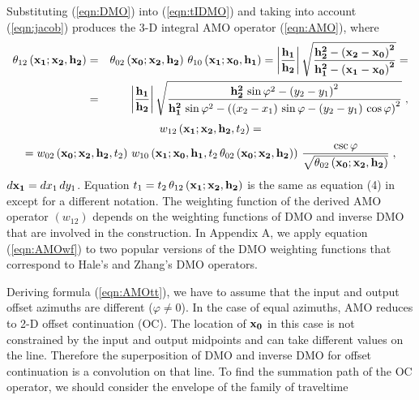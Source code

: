 \par
Substituting (\ref{eqn:DMO}) into (\ref{eqn:tIDMO}) and taking into account
(\ref{eqn:jacob}) produces the 3-D integral AMO operator (\ref{eqn:AMO}),
where
\begin{eqnarray}
\theta_{12}\left({\bf x_1;x_2, h_2}\right) & = &
\theta_{02}\left({\bf x_0;x_2, h_2}\right)\,
\theta_{10}\left({\bf x_1;x_0, h_1}\right)=
{\left|{\bf h_1 \over h_2}\right|}\,
\sqrt{{\bf {h_2^2-\left(x_2-x_0\right)^2} \over
{h_1^2-\left(x_1-x_0\right)^2}}}=
\nonumber \\
& = &
{\left|{\bf h_1 \over h_2}\right|}\,
\sqrt{{{\bf h_2^2}\,\sin{\varphi}^2-\left(y_2-y_1\right)^2} \over
{{\bf h_1^2}\,\sin{\varphi}^2-
\left(\left(x_2-x_1\right)\,\sin{\varphi}-
\left(y_2-y_1\right)\,\cos{\varphi}\right)^2}}\;,
\label{eqn:AMOtt}
\end{eqnarray}
\begin{eqnarray*}
w_{12}\left({\bf x_1;x_2, h_2},t_2\right) = 
\end{eqnarray*}
\begin{equation}
= w_{02}\left({\bf x_0;x_2, h_2},t_2\right)\,
w_{10}\left({\bf x_1;x_0, h_1},t_2\,
\theta_{02}\left({\bf x_0;x_2, h_2}\right)\right)\,
{\csc{\varphi}\over \sqrt{\theta_{02}\left({\bf x_0;x_2, h_2}\right)}}\;,
\label{eqn:AMOwf}
\end{equation}
$d{\bf x_1}=dx_1\,dy_1$. Equation 
$t_1=t_2\,\theta_{12}\left({\bf x_1;x_2, h_2}\right)$ is the same
as equation (4) in \cite[]{Biondi.sep.80.125} except for a different
notation. The weighting function of the derived AMO operator
$\left(w_{12}\right)$ 
depends on the weighting functions of DMO and inverse DMO that are involved in
the construction. In Appendix A, we apply equation (\ref{eqn:AMOwf}) to two
popular versions of the DMO weighting functions that
correspond to Hale's \cite[]{Hale} and Zhang's
\cite[]{Zhang.sep.59.201} DMO operators.
\par
Deriving formula (\ref{eqn:AMOtt}), we have to assume
that the input 
and output offset azimuths are different ($\varphi \neq 0$). In the case
of equal azimuths, AMO reduces to 2-D offset continuation (OC). The
location of ${\bf x_0}$ in this case is not constrained by the input
and output midpoints and can take different values on the line.
Therefore the superposition of DMO and inverse DMO for offset
continuation is a convolution on that line. To find the summation path
of the OC operator, we should consider the envelope of the family of traveltime
